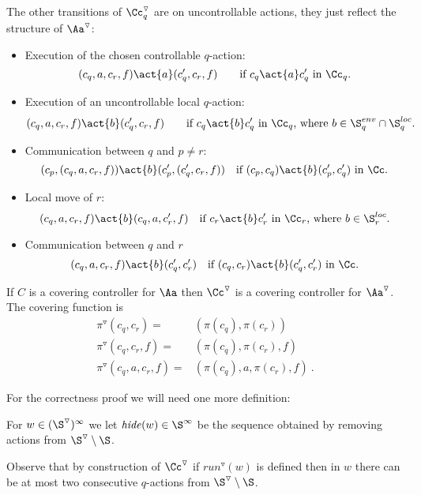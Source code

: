 \documentclass[10pt,a4paper]{article}
\newcommand{\run}{\mathit{run}}
\newcommand{\hide}{\mathit{hide}}
\newcommand{\red}[1]{#1^\triangledown}
\newcommand{\Sloc}{\S^{loc}}
\newcommand{\Senv}{\S^{env}}
\begin{document}
The other transitions of $\red\Cc_q$ are on uncontrollable actions,
they just reflect the structure of $\red\Aa$:
\begin{itemize}
\item Execution of the chosen controllable $q$-action:
\[ (c_q,a,c_r,f)\act{a}(c'_q,c_r,f)\qquad
\text{if $c_q\act{a}c_q'$ in $\Cc_q$.} \]

\item Execution of an uncontrollable local $q$-action:
  \[ (c_q,a,c_r,f)\act{b}(c'_q,c_r,f)\qquad \text{if $c_q\act{b}c_q'$
    in $\Cc_q$, where $b \in \Senv_q \cap \Sloc_q$.} \]

\item Communication between $q$ and $p\not=r$:
\[(c_p,(c_q,a,c_r,f))\act{b}(c_p',(c_q',c_r,f))\quad
\text{if $(c_p,c_q)\act{b} (c_p',c_q')$ in $\Cc$.}\]

\item Local move of $r$:
\[(c_q,a,c_r,f)\act{b} (c_q,a,c_r',f)\quad \text{if $c_r\act{b}c_r'$ in
  $\Cc_r$, where $b \in \Sloc_r$.} \]

\item Communication between $q$ and $r$
\[(c_q,a,c_r,f)\act{b}(c_q',c_r')\quad
\text{if $(c_q,c_r)\act{b}(c_q',c_r')$ in $\Cc$.}\]
\end{itemize}

\begin{lemma}\label{lemma:C is covering}
  If $C$ is a covering controller for $\Aa$ then $\red\Cc$  is a
  covering controller for $\red\Aa$. The covering function is
  \begin{align*}
    \red\pi(c_q,c_r)=& (\pi(c_q),\pi(c_r))\\
    \red\pi(c_q,c_r,f)=& (\pi(c_q),\pi(c_r),f)\\
    \red\pi(c_q,a,c_r,f)=& (\pi(c_q),a,\pi(c_r),f)\ .
  \end{align*}
\end{lemma}


For the correctness proof we will need one more definition:

\begin{definition}[$\hide$]
  For $w\in(\red\S)^\infty$ we let $\hide(w)\in\S^\infty$ be
  the sequence obtained by removing actions from $\red\S
  \setminus\S$.
\end{definition}

Observe that by construction of $\red\Cc$ if $\red\run(w)$ is defined
then in $w$ there can be at most two consecutive $q$-actions from
$\red\S \setminus \S$.
\end{document}
